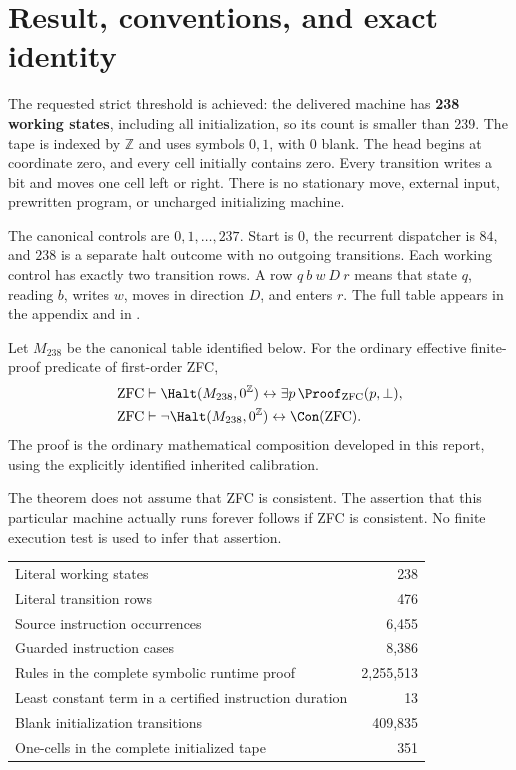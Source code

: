 \section{Result, conventions, and exact identity}
\label{sec:result}

The requested strict threshold is achieved: the delivered machine has
\textbf{238 working states}, including all initialization, so its count
is smaller than 239. The tape is indexed by $\mathbb Z$ and uses symbols
$0,1$, with $0$ blank. The head begins at coordinate zero, and every cell
initially contains zero. Every transition writes a bit and moves one cell
left or right. There is no stationary move, external input, prewritten
program, or uncharged initializing machine.

The canonical controls are $0,1,\ldots,237$. Start is $0$, the recurrent
dispatcher is $84$, and $238$ is a separate halt outcome with no outgoing
transitions. Each working control has exactly two transition rows.
A row $q\ b\ w\ D\ r$ means that state $q$, reading $b$, writes $w$,
moves in direction $D$, and enters $r$. The full table appears in the
appendix and in .

\begin{theorem}
\label{thm:main}
Let $M_{238}$ be the canonical table identified below. For the ordinary
effective finite-proof predicate of first-order ZFC,
\begin{align*}
 \mathrm{ZFC}&\vdash
 \Halt(M_{238},0^{\mathbb Z})
 \leftrightarrow \exists p\,\Proof_{\mathrm{ZFC}}(p,\bot),\\
 \mathrm{ZFC}&\vdash
 \neg\Halt(M_{238},0^{\mathbb Z})\leftrightarrow\Con(\mathrm{ZFC}).
\end{align*}
The proof is the ordinary mathematical composition developed in this
report, using the explicitly identified inherited calibration.
\end{theorem}

The theorem does not assume that ZFC is consistent. The assertion that
this particular machine actually runs forever follows if ZFC is
consistent. No finite execution test is used to infer that assertion.

\begin{center}
\begin{tabular}{lr}
\toprule
Literal working states & 238\\
Literal transition rows & 476\\
Source instruction occurrences & 6,455\\
Guarded instruction cases & 8,386\\
Rules in the complete symbolic runtime proof & 2,255,513\\
Least constant term in a certified instruction duration & 13\\
Blank initialization transitions & 409,835\\
One-cells in the complete initialized tape & 351\\
\bottomrule
\end{tabular}
\end{center}

